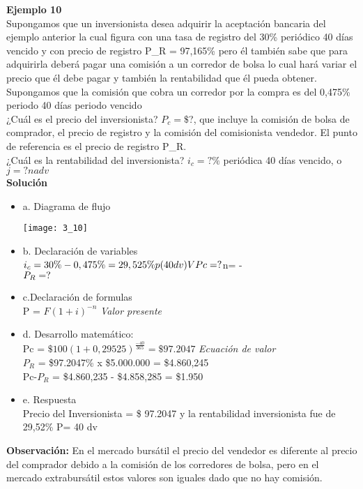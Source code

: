 	\textbf{Ejemplo 10}\\
	
	Supongamos que un inversionista desea adquirir la aceptación bancaria del ejemplo anterior la cual figura con una tasa de registro del 30\% periódico 40 días vencido y con precio de registro P_{R} = 97,165\% pero él también sabe que para adquirirla deberá pagar una comisión a un corredor de bolsa lo cual hará variar el precio que él debe pagar y también la rentabilidad que él pueda obtener.\\
	
	Supongamos que la comisión que cobra un corredor por la compra es del 0,475\% periodo 40 días periodo vencido\\
	¿Cuál es el precio del inversionista? $P_{c} = \$$?, que incluye la comisión de bolsa de comprador, el precio de registro y la comisión del comisionista vendedor. El punto de referencia es el precio de registro P_{R}.\\
	¿Cuál es la rentabilidad del inversionista? $i_{c} =? \%$ periódica 40 días vencido, o $j =? nadv$\\
	
	\textbf{Solución}\\
	\begin{itemize}
		\item a. Diagrama de flujo\\
		\begin{center}
			\texttt{[image: 3\_10]}
		\end{center}	
		\item b. Declaración de variables\\ 
		$i_{c} = 30\% - 0,475\% = 29,525\% p(40dv)\\
		VPc = ?\\
		$n= -\\$\\
		P_{R}=?$\\
		\item c.Declaración de formulas\\
		P = $F(1+i)^{-n}$ \hspace{35}\textit{Valor presente}\\
		\item d. Desarrollo matemático:\\
		Pc = $ \$100(1+0,29525)^\frac{-40}{365} = \$97.2047$ \hspace{35}\textit{Ecuación de valor} \\
		$P_{R}$ = \$97.2047\% x \$5.000.000 = \$4.860,245\\
		Pc-$P_{R}$ = \$4.860,235 - \$4.858,285 = \$1.950\\ 
		\item e. Respuesta\\
		Precio del Inversionista = \$ 97.2047 y la rentabilidad inversionista fue de 29,52\% P= 40 dv \\

		
	\end{itemize}
	\textbf{Observación:} En el mercado bursátil el precio del vendedor es diferente al precio del comprador debido a la comisión de los corredores de bolsa, pero en el mercado extrabursátil estos valores son iguales dado que no hay comisión.\\
	
